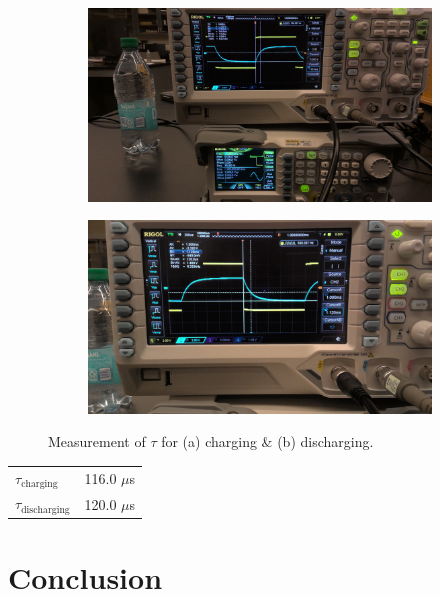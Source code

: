 \documentclass{article}
\begin{document}
        \begin{figure}
            \begin{subfigure}{0.5\linewidth}
                \includegraphics[width=\linewidth]{tau charging.jpg}
                \caption{}
            \end{subfigure}
            \begin{subfigure}{0.5\linewidth}
                \includegraphics[width=\linewidth]{tau discharging.jpg}
                \caption{}
            \end{subfigure}
            \caption{Measurement of $\tau$ for (a) charging \& (b) discharging.}
            \label{measuringtau}
        \end{figure}

    \begin{table}[h]
        \centering
        \begin{tabular}{@{}l|r@{}}
            \toprule
            $\tau_\mathrm{charging}$ & 116.0 $\mu$s \\
            $\tau_\mathrm{discharging}$ & 120.0 $\mu$s \\
            \bottomrule
        \end{tabular}
    \end{table}

\section{Conclusion}
\end{document}
